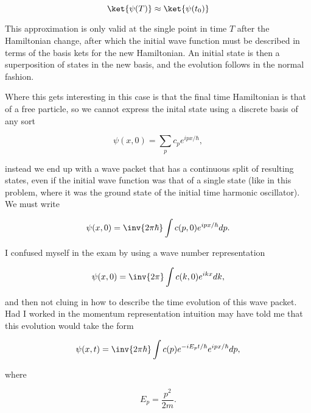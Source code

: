 \begin{equation}\label{eqn:qmTwoExamReflection:50}
\ket{\psi(T)} \approx \ket{\psi(t_0)}
\end{equation}

This approximation is only valid at the single point in time $T$ after the Hamiltonian change, after which the initial wave function must be described in terms of the basis kets for the new Hamiltonian.  An initial state is then a superposition of states in the new basis, and the evolution follows in the normal fashion.

Where this gets interesting in this case is that the final time Hamiltonian is that of a free particle, so we cannot express the inital state using a discrete basis of any sort

\begin{equation}\label{eqn:qmTwoExamReflection:70}
\psi(x, 0) = \sum_p c_p e^{i p x/\hbar},
\end{equation}

instead we end up with a wave packet that has a continuous split of resulting states, even if the initial wave function was that of a single state (like in this problem, where it was the ground state of the initial time harmonic oscillator).  We must write

\begin{equation}\label{eqn:qmTwoExamReflection:90}
\psi(x, 0) = \inv{2 \pi \hbar} \int c(p, 0) e^{i p x/\hbar} dp.
\end{equation}

I confused myself in the exam by using a wave number representation

\begin{equation}\label{eqn:qmTwoExamReflection:110}
\psi(x, 0) = \inv{2 \pi} \int c(k, 0) e^{i k x} dk,
\end{equation}

and then not cluing in how to describe the time evolution of this wave packet.  Had I worked in the momentum representation intuition may have told me that this evolution would take the form

\begin{equation}\label{eqn:qmTwoExamReflection:130}
\psi(x, t) = \inv{2 \pi \hbar} \int c(p) e^{- i E_p t/\hbar} e^{i p x/\hbar} dp,
\end{equation}

where

\begin{equation}\label{eqn:qmTwoExamReflection:150}
E_p = \frac{p^2}{2m}.
\end{equation}

